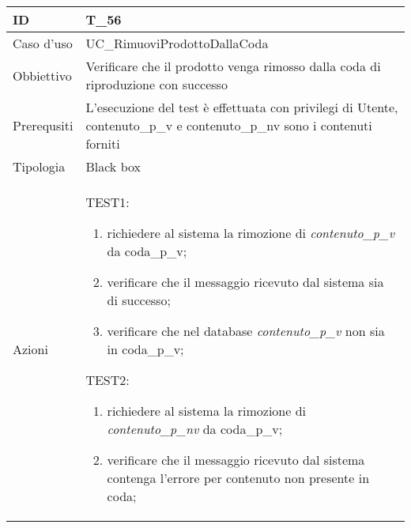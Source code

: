 \begin{table}[hb]
    \centering
    \begin{tabular}{ |p{2cm}|p{10cm}|  }
        \hline
        ID          & T\_56                                                                 \\\hline
        Caso d'uso  & UC\_RimuoviProdottoDallaCoda                                                    \\\hline
        Obbiettivo  & Verificare che il prodotto venga rimosso dalla coda di riproduzione con successo \\\hline
        Prerequsiti & L'esecuzione del test è effettuata con privilegi di Utente, contenuto\_p\_v
        e contenuto\_p\_nv sono i contenuti forniti           \\\hline
        Tipologia   & Black box                                                             \\\hline
        Azioni      &
        TEST1:
        \begin{enumerate}[nosep, topsep=0pt]
            \item richiedere al sistema la rimozione di \emph{contenuto\_p\_v} da coda\_p\_v;
            \item verificare che il messaggio ricevuto dal sistema sia di successo;
            \item verificare che nel database \emph{contenuto\_p\_v} non sia in coda\_p\_v;
        \end{enumerate}
        \vspace{0.5cm} TEST2:
        \begin{enumerate}[nosep, topsep=0pt]
            \item richiedere al sistema la rimozione di \emph{contenuto\_p\_nv} da coda\_p\_v;
            \item verificare che il messaggio ricevuto dal sistema contenga l'errore per
            contenuto non presente in coda;
        \end{enumerate}
        \\\hline
    \end{tabular}
\end{table}

